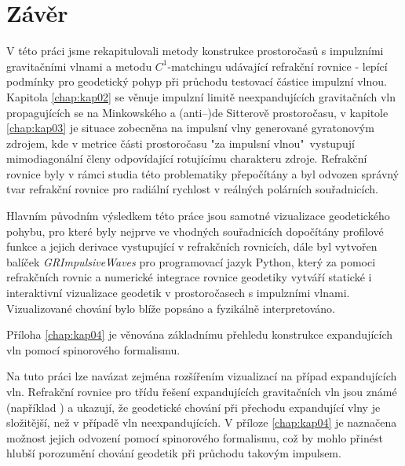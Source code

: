 \chapter*{Závěr}

V této práci jsme rekapitulovali metody konstrukce prostoročasů s impulzními gravitačními vlnami
a metodu $C^1$-matchingu udávající refrakční rovnice - lepící podmínky pro geodetický pohyp při průchodu
testovací částice impulzní vlnou. Kapitola \ref{chap:kap02} se věnuje impulzní limitě neexpandujících
gravitačních vln propagujících se na Minkowského a (anti--)de Sitterově prostoročasu, v kapitole \ref{chap:kap03}
je situace zobecněna na impulsní vlny generované gyratonovým zdrojem, kde v metrice části prostoročasu "za impulsní vlnou"\
vystupují mimodiagonální členy odpovídající rotujícímu charakteru zdroje.
Refrakční rovnice byly v rámci studia této problematiky přepočítány a byl odvozen správný tvar refrakční rovnice
pro radiální rychlost v reálných polárních souřadnicích.

Hlavním původním výsledkem této práce jsou samotné vizualizace geodetického pohybu, pro které byly nejprve ve vhodných souřadnicích dopočítány
profilové funkce a jejich derivace vystupující v refrakčních rovnicích, dále byl vytvořen balíček \textit{GRImpulsiveWaves} pro programovací jazyk
Python, který za pomoci refrakčních rovnic a numerické integrace rovnice geodetiky
vytváří statické i interaktivní vizualizace geodetik v prostoročasech s impulzními vlnami.
Vizualizované chování bylo blíže popsáno a fyzikálně interpretováno.

Příloha \ref{chap:kap04} je věnována základnímu přehledu konstrukce expandujících vln pomocí spinorového formalismu.

Na tuto práci lze navázat zejména rozšířením vizualizací na případ expandujících vln. Refrakční rovnice pro
třídu řešení expandujících gravitačních vln jsou známé (například \cite{Podolsky:2016mqg}) a ukazují, že
geodetické chování při přechodu expandující vlny je složitější, než v případě vln neexpandujících. V příloze \ref{chap:kap04}
je naznačena možnost jejich odvození pomocí spinorového formalismu, což by mohlo přinést hlubší porozumění chování geodetik
při průchodu takovým impulsem.

\clearpage
